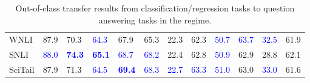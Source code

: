 \begin{landscape}
\begin{table}[t]
\begin{adjustbox}{max width=2\textwidth}
\begin{tabular}{ l l l l l  l l l l  l l l }
WNLI & 87.9 & 70.3 & \textcolor{blue}{64.3} & 67.9 & 65.3 & 22.3 & 62.3 & \textcolor{blue}{50.7} & \textcolor{blue}{63.7} & \textcolor{blue}{32.5} & 61.9\\
SNLI & \textcolor{blue}{88.0} & \textbf{\textcolor{blue}{74.3}} & \textbf{\textcolor{blue}{65.1}} & \textcolor{blue}{68.7} & \textcolor{blue}{68.2} & 22.4 & 62.8 & \textcolor{blue}{50.9} & 62.9 & 28.8 & 62.1\\
SciTail & 87.9 & 71.3 & \textcolor{blue}{64.5} & \textbf{\textcolor{blue}{69.4}} & \textcolor{blue}{68.3} & \textcolor{blue}{22.7} & \textcolor{blue}{63.3} & \textcolor{blue}{51.0} & 63.0 & \textcolor{blue}{33.0} & 61.6\\
\bottomrule
\end{tabular}
\end{adjustbox}
\caption{Out-of-class transfer results from classification/regression tasks to question answering tasks in the  regime.}
\label{tbla9a}
\end{table}
\end{landscape}